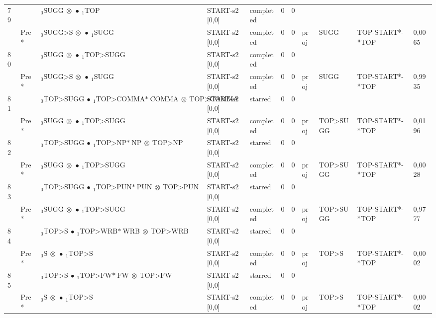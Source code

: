 \documentclass[10pt]{article}
\begin{document}
\begin{longtable}[htbp]{lllllllllll}
79 & & $ {}_0 \textrm{SUGG} \  \otimes \  \bullet \ {}_{1} \textrm{TOP} $ & START-s2 [0,0] & completed & 0 & 0 & & & & \\ 
 & Pre *& $ {}_0 \textrm{SUGG>S} \  \otimes \  \bullet \ {}_{1} \textrm{SUGG} $ & START-s2 [0,0] & completed & 0 & 0 & proj & SUGG & TOP-START*-*TOP & 0,0065 \\ 
80 & & $ {}_0 \textrm{SUGG} \  \otimes \  \bullet \ {}_{1} \textrm{TOP>SUGG} $ & START-s2 [0,0] & completed & 0 & 0 & & & & \\ 
 & Pre *& $ {}_0 \textrm{SUGG>S} \  \otimes \  \bullet \ {}_{1} \textrm{SUGG} $ & START-s2 [0,0] & completed & 0 & 0 & proj & SUGG & TOP-START*-*TOP & 0,9935 \\ 
81 & & $ {}_0 \textrm{TOP>SUGG} \  \bullet \ {}_{1} \textrm{TOP>COMMA*} \ \textrm{COMMA} \  \otimes \ \textrm{TOP>COMMA} $ & START-s2 [0,0] & starred & 0 & 0 & & & & \\ 
 & Pre *& $ {}_0 \textrm{SUGG} \  \otimes \  \bullet \ {}_{1} \textrm{TOP>SUGG} $ & START-s2 [0,0] & completed & 0 & 0 & proj & TOP>SUGG & TOP-START*-*TOP & 0,0196 \\ 
82 & & $ {}_0 \textrm{TOP>SUGG} \  \bullet \ {}_{1} \textrm{TOP>NP*} \ \textrm{NP} \  \otimes \ \textrm{TOP>NP} $ & START-s2 [0,0] & starred & 0 & 0 & & & & \\ 
 & Pre *& $ {}_0 \textrm{SUGG} \  \otimes \  \bullet \ {}_{1} \textrm{TOP>SUGG} $ & START-s2 [0,0] & completed & 0 & 0 & proj & TOP>SUGG & TOP-START*-*TOP & 0,0028 \\ 
83 & & $ {}_0 \textrm{TOP>SUGG} \  \bullet \ {}_{1} \textrm{TOP>PUN*} \ \textrm{PUN} \  \otimes \ \textrm{TOP>PUN} $ & START-s2 [0,0] & starred & 0 & 0 & & & & \\ 
 & Pre *& $ {}_0 \textrm{SUGG} \  \otimes \  \bullet \ {}_{1} \textrm{TOP>SUGG} $ & START-s2 [0,0] & completed & 0 & 0 & proj & TOP>SUGG & TOP-START*-*TOP & 0,9777 \\ 
84 & & $ {}_0 \textrm{TOP>S} \  \bullet \ {}_{1} \textrm{TOP>WRB*} \ \textrm{WRB} \  \otimes \ \textrm{TOP>WRB} $ & START-s2 [0,0] & starred & 0 & 0 & & & & \\ 
 & Pre *& $ {}_0 \textrm{S} \  \otimes \  \bullet \ {}_{1} \textrm{TOP>S} $ & START-s2 [0,0] & completed & 0 & 0 & proj & TOP>S & TOP-START*-*TOP & 0,0002 \\ 
85 & & $ {}_0 \textrm{TOP>S} \  \bullet \ {}_{1} \textrm{TOP>FW*} \ \textrm{FW} \  \otimes \ \textrm{TOP>FW} $ & START-s2 [0,0] & starred & 0 & 0 & & & & \\ 
 & Pre *& $ {}_0 \textrm{S} \  \otimes \  \bullet \ {}_{1} \textrm{TOP>S} $ & START-s2 [0,0] & completed & 0 & 0 & proj & TOP>S & TOP-START*-*TOP & 0,0002 \\ 

\end{longtable}
\end{document}
